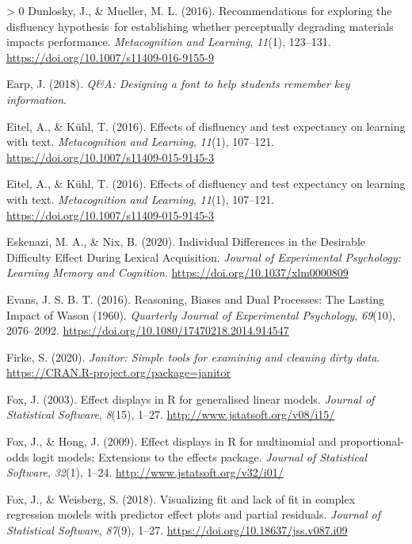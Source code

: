 \documentclass[
  english,
  jou]{apa7}
\newlength{\cslhangindent}
\newenvironment{CSLReferences}[3] %
 {%
  \setlength{\parindent}{0pt}
  \ifodd #1 \everypar{\setlength{\hangindent}{\cslhangindent}}\ignorespaces\fi
  \ifnum #2 > 0
  \setlength{\parskip}{#2\baselineskip}
  \fi
 }%
 {}
\begin{document}
\begin{CSLReferences}{1}{0}
\leavevmode\hypertarget{ref-Dunlosky2016}{}%
Dunlosky, J., \& Mueller, M. L. (2016). {Recommendations for exploring the disfluency hypothesis~for establishing whether perceptually degrading materials impacts performance}. \emph{Metacognition and Learning}, \emph{11}(1), 123--131. \url{https://doi.org/10.1007/s11409-016-9155-9}

\leavevmode\hypertarget{ref-Earp2018}{}%
Earp, J. (2018). \emph{{Q{\&}A: Designing a font to help students remember key information}}.

\leavevmode\hypertarget{ref-Eitel2016}{}%
Eitel, A., \& Kühl, T. (2016). {Effects of disfluency and test expectancy on learning with text}. \emph{Metacognition and Learning}, \emph{11}(1), 107--121. \url{https://doi.org/10.1007/s11409-015-9145-3}

\leavevmode\hypertarget{ref-Eitel2016}{}%
Eitel, A., \& Kühl, T. (2016). {Effects of disfluency and test expectancy on learning with text}. \emph{Metacognition and Learning}, \emph{11}(1), 107--121. \url{https://doi.org/10.1007/s11409-015-9145-3}

\leavevmode\hypertarget{ref-Eskenazi2020}{}%
Eskenazi, M. A., \& Nix, B. (2020). {Individual Differences in the Desirable Difficulty Effect During Lexical Acquisition}. \emph{Journal of Experimental Psychology: Learning Memory and Cognition}. \url{https://doi.org/10.1037/xlm0000809}

\leavevmode\hypertarget{ref-Evans2016}{}%
Evans, J. S. B. T. (2016). {Reasoning, Biases and Dual Processes: The Lasting Impact of Wason (1960)}. \emph{Quarterly Journal of Experimental Psychology}, \emph{69}(10), 2076--2092. \url{https://doi.org/10.1080/17470218.2014.914547}

\leavevmode\hypertarget{ref-R-janitor}{}%
Firke, S. (2020). \emph{Janitor: Simple tools for examining and cleaning dirty data}. \url{https://CRAN.R-project.org/package=janitor}

\leavevmode\hypertarget{ref-R-effects_b}{}%
Fox, J. (2003). Effect displays in {R} for generalised linear models. \emph{Journal of Statistical Software}, \emph{8}(15), 1--27. \url{http://www.jstatsoft.org/v08/i15/}

\leavevmode\hypertarget{ref-R-effects_c}{}%
Fox, J., \& Hong, J. (2009). Effect displays in {R} for multinomial and proportional-odds logit models: Extensions to the {effects} package. \emph{Journal of Statistical Software}, \emph{32}(1), 1--24. \url{http://www.jstatsoft.org/v32/i01/}

\leavevmode\hypertarget{ref-R-effects_a}{}%
Fox, J., \& Weisberg, S. (2018). Visualizing fit and lack of fit in complex regression models with predictor effect plots and partial residuals. \emph{Journal of Statistical Software}, \emph{87}(9), 1--27. \url{https://doi.org/10.18637/jss.v087.i09}


\end{CSLReferences}
\end{document}
